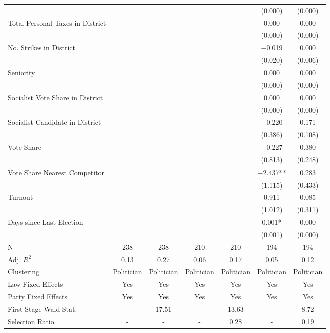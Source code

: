 \begin{table}[!h]
{\begin{threeparttable}
\begin{tabular}[t]{lcccccc}
 &  &  &  &  & (\num{0.000}) & \vphantom{3} (\num{0.000})\\
Total Personal Taxes in District &  &  &  &  & \num{0.000} & \num{0.000}\\
 &  &  &  &  & (\num{0.000}) & \vphantom{2} (\num{0.000})\\
No. Strikes in District &  &  &  &  & \num{-0.019} & \num{0.000}\\
 &  &  &  &  & (\num{0.020}) & (\num{0.006})\\
Seniority &  &  &  &  & \num{0.000} & \num{0.000}\\
 &  &  &  &  & (\num{0.000}) & \vphantom{1} (\num{0.000})\\
Socialist Vote Share in District &  &  &  &  & \num{0.000} & \num{0.000}\\
 &  &  &  &  & (\num{0.000}) & (\num{0.000})\\
Socialist Candidate in District &  &  &  &  & \num{-0.220} & \num{0.171}\\
 &  &  &  &  & (\num{0.386}) & (\num{0.108})\\
Vote Share &  &  &  &  & \num{-0.227} & \num{0.380}\\
 &  &  &  &  & (\num{0.813}) & (\num{0.248})\\
Vote Share Nearest Competitor &  &  &  &  & \num{-2.437}** & \num{0.283}\\
 &  &  &  &  & (\num{1.115}) & (\num{0.433})\\
Turnout &  &  &  &  & \num{0.911} & \num{0.085}\\
 &  &  &  &  & (\num{1.012}) & (\num{0.311})\\
Days since Last Election &  &  &  &  & \num{0.001}* & \num{0.000}\\
 &  &  &  &  & (\num{0.001}) & (\num{0.000})\\
\midrule
N & \num{238} & \num{238} & \num{210} & \num{210} & \num{194} & \num{194}\\
Adj. $R^2$ & \num{0.13} & \num{0.27} & \num{0.06} & \num{0.17} & \num{0.05} & \num{0.12}\\
Clustering & Politician & Politician & Politician & Politician & Politician & Politician\\
Law Fixed Effects & Yes & Yes & Yes & Yes & Yes & Yes\\
Party Fixed Effects & Yes & Yes & Yes & Yes & Yes & Yes\\
First-Stage Wald Stat. &  & 17.51 &  & 13.63 &  & 8.72\\
Selection Ratio & - & - & - & 0.28 & - & 0.19\\

\end{tabular}
\end{threeparttable}}
\end{table}
